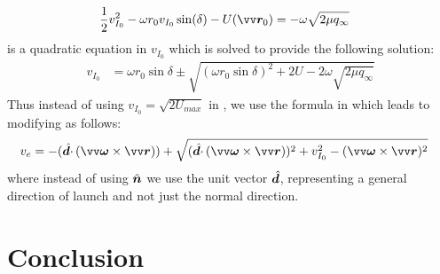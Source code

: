 \begin{align}
    \frac{1}{2} v_{I_0}^2 - \omega r_0 v_{I_0} \sin(\delta) - U(\bv{r}_0) &= -\omega \sqrt{2\mu q_{\infty}}
    \label{eqn:jacobian_equate_equatorial_mod}
\end{align}
 is a quadratic equation in $v_{I_0}$ which is solved to provide the following solution:
\begin{align}
    v_{I_0} &= \omega r_0 \sin\delta \pm \sqrt{(\omega r_0 \sin\delta)^2 + 2U - 2\omega\sqrt{2\mu q_\infty}}
    \label{eqn:non_conservative_inertial_guaranteed_escape_speed}
\end{align}
Thus instead of using $v_{I_0} = \sqrt{2U_{max}}$ in , we use the formula in  which leads to modifying  as follows:
\begin{align}
    v_e &= -(\buv{d} \cdotp (\bv{\omega} \times \bv{r})) + \sqrt{(\buv{d} \cdotp (\bv{\omega} \times \bv{r}))^2 + v_{I_0}^2 - (\bv{\omega} \times {\bv{r}})^2}
    \label{eqn:nonconservative_escape_speed}
\end{align}
where instead of using $\hat{\bm{n}}$ we use the unit vector $\hat{\bm{d}}$, representing a general direction of launch and not just the normal direction.

\section{Conclusion}
\label{sec:dynamics_conclusion}
